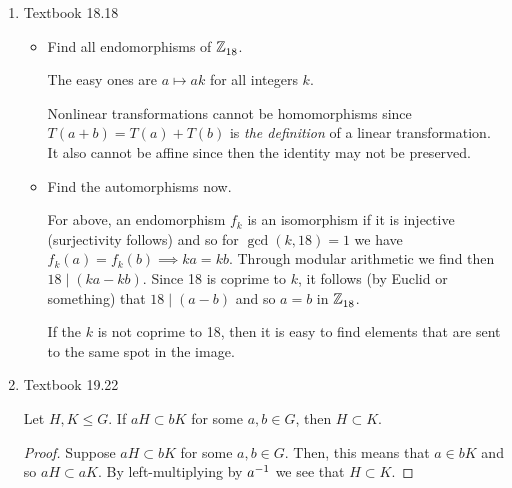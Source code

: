 \documentclass{article}
\begin{document}
\begin{enumerate}[start=1,label={(\arabic*)}]
        \begin{proposition}{}{}
          For $\lambda \from G \to H$, if $\ker \lambda$ is trivial then $\lambda$ is injective.
        \end{proposition}

        Luckily I literally proved this in my notes like a month ago:

        \begin{proof}
          Suppose $\lambda$ has trivial kernel.
          Let $a, b$ so that $\lambda(a) = \lambda(b)$.
          Then, we have that $e = \lambda(b)\lambda(a)\inv$ and so $\lambda(b a\inv) = e$.
          Therefore, $a\inv = b\inv$ and so $a = b$.
        \end{proof}


  \item Textbook 18.18

        \begin{itemize}
          \item Find all endomorphisms of $\mathbb{Z}^{}_{18}$.

                The easy ones are $a \mapsto ak$ for all integers $k$.

                Nonlinear transformations cannot be homomorphisms since $T(a + b) = T(a) + T(b)$ is \emph{the definition}
                of a linear transformation. It also cannot be affine since then the identity may not be preserved.

          \item Find the automorphisms now.

                For above, an endomorphism $f_{k}$ is an isomorphism if it is injective (surjectivity follows)
                and so for $\gcd(k, 18) = 1$ we have $f_{k}(a) = f_{k}(b) \implies ka = kb$.
                Through modular arithmetic we find then $18 \mid (ka - kb)$.
                Since 18 is coprime to $k$, it follows (by Euclid or something) that $18 \mid (a - b)$ and so $a = b$ in $\mathbb{Z}^{}_{18}$.

                If the $k$ is not coprime to 18, then it is easy to find elements that are sent to the same spot in the image.
        \end{itemize}


  \item Textbook 19.22

        \begin{proposition}{}{}
          Let $H, K \le G$. If $aH \subset bK$ for some $a, b \in G$, then $H \subset K$.
        \end{proposition}

        \begin{proof}
          Suppose $aH \subset bK$ for some $a, b \in G$.
          Then, this means that $a \in bK$ and so $aH \subset aK$.
          By left-multiplying by $a^{-1}$ we see that $H \subset K$.
        \end{proof}

\end{enumerate}
\end{document}
